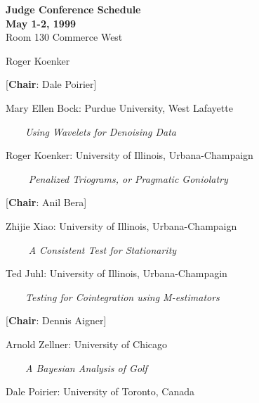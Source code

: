 \setlength{\textwidth}{170mm}
\setlength{\textheight}{230mm}
\setlength{\oddsidemargin}{0mm}
\setlength{\evensidemargin}{-10mm}
\setlength{\topmargin}{00mm}
\renewcommand{\baselinestretch}{1}
\newcommand{\REF}{\nopagebreak\noindent{\large{\bf
      References}}\vspace{.2in}}

\pagestyle{empty}


\begin{center}
{\bf Judge Conference Schedule\\
May 1-2, 1999}\\
Room 130 Commerce West

\vspace{5mm}
\end{center}


 Roger Koenker

[{\bf Chair}: Dale Poirier]

Mary Ellen Bock: Purdue University, West Lafayette

$\qquad${\em Using Wavelets for Denoising Data}

Roger Koenker:  University  of Illinois, Urbana-Champaign
 
$\qquad$ {\em Penalized Triograms, or Pragmatic Goniolatry}


[{\bf Chair}: Anil Bera]

Zhijie Xiao: University of Illinois, Urbana-Champaign

$\qquad$ {\em A Consistent Test for Stationarity}

Ted Juhl:  University of Illinois, Urbana-Champagin

$\qquad ${\em Testing for Cointegration using M-estimators}


[{\bf Chair}: Dennis Aigner]

Arnold  Zellner:   University  of Chicago

$\qquad ${\em A Bayesian Analysis of Golf}

Dale Poirier:  University of  Toronto, Canada

